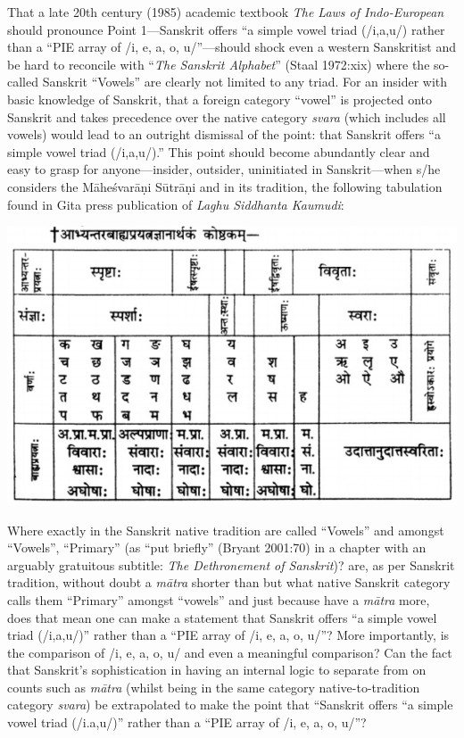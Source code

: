 That a late 20th century (1985) academic textbook \textit{The Laws of Indo-European} should pronounce Point 1—Sanskrit offers “a simple vowel triad (/i,a,u/) rather than a “PIE array of /i, e, a, o, u/”—should shock even a western Sanskritist and be hard to reconcile with “\textit{The Sanskrit Alphabet}” (Staal 1972:xix) where the so-called Sanskrit “Vowels” are clearly not limited to any triad. For an insider with basic knowledge of Sanskrit, that a foreign category “vowel” is projected onto Sanskrit and takes precedence over the native category \textit{svara} (which includes all vowels) would lead to an outright dismissal of the point: that Sanskrit offers “a simple vowel triad (/i,a,u/).” This point should become abundantly clear and easy to grasp for anyone—insider, outsider, uninitiated in Sanskrit—when s/he considers the Māheśvarāṇi Sūtrāṇi and in its tradition, the following tabulation found in Gita press publication of \textit{Laghu Siddhanta Kaumudi}:

\begin{center}
\includegraphics{"images/article-03/art03-fig01.png"}
\end{center}

Where exactly in the Sanskrit native tradition are  called “Vowels” and amongst “Vowels”, “Primary” (as “put briefly” (Bryant 2001:70) in a chapter with an arguably gratuitous subtitle: \textit{The Dethronement of Sanskrit})?  are, as per Sanskrit tradition, without doubt a \textit{mātra} shorter than  but what native Sanskrit category calls them “Primary” amongst “vowels” and just because  have a \textit{mātra} more, does that mean one can make a statement that Sanskrit offers “a simple vowel triad (/i,a,u/)” rather than a “PIE array of /i, e, a, o, u/”? More importantly, is the comparison of /i, e, a, o, u/ and  even a meaningful comparison? Can the fact that Sanskrit’s sophistication in having an internal logic to separate  from  on counts such as \textit{mātra} (whilst being in the same category native-to-tradition category \textit{svara}) be extrapolated to make the point that “Sanskrit offers “a simple vowel triad (/i.a,u/)” rather than a “PIE array of /i, e, a, o, u/”?


